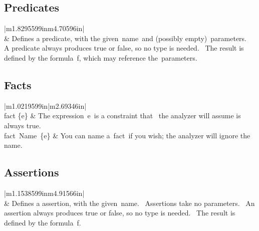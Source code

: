 \documentclass[oneside]{book}
\begin{document}
\subsection{Predicates}
\begin{flushleft}
\tablefirsthead{}
\tablehead{}
\tabletail{}
\tablelasttail{}
\begin{supertabular}{|m{1.8295599in}m{4.70596in}|}
\hline
{}\\\hline
{} &
Defines a predicate, with the given~name~and (possibly empty)~parameters.~\newline
A predicate always produces true or false, so no type is needed.~\newline
The result is defined by the formula~f, which may reference the~parameters.~\\\hline
\end{supertabular}
\end{flushleft}
\subsection{Facts}
\begin{flushleft}
\tablefirsthead{}
\tablehead{}
\tabletail{}
\tablelasttail{}
\begin{supertabular}{|m{1.0219599in}|m{2.69346in}|}
\hline
{}\\\hline
fact \{e\} &
The expression~e~is a constraint that~\newline
the analyzer will assume is always true.~\\\hline
fact~Name~\{e\} &
You can name a~fact~if you wish;\newline
the analyzer will ignore the name.\\\hline
\end{supertabular}
\end{flushleft}
\subsection{Assertions}
\begin{flushleft}
\tablefirsthead{}
\tablehead{}
\tabletail{}
\tablelasttail{}
\begin{supertabular}{|m{1.1538599in}m{4.91566in}|}
\hline
{}\\\hline
{} &
Defines a assertion, with the given~name.~ Assertions take no parameters.~\newline
An assertion always produces true or false, so no type is needed.~\newline
The result is defined by the formula~f.~\\\hline
\end{supertabular}
\end{flushleft}

\bigskip
\end{document}
